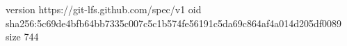 version https://git-lfs.github.com/spec/v1
oid sha256:5c69de4bfb64bb7335c007c5c1b574fe56191c5da69c864af4a014d205df0089
size 744
